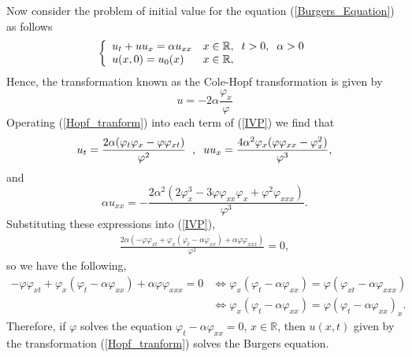    	\noindent Now consider the problem of initial value for the equation (\ref{Burgers_Equation}) as follows
    \begin{equation}
        \left \lbrace \begin{array}{ll}
    	u_t + u u_x = \alpha u_{xx} & x \in \mathbb{R}, \hspace{2mm} t > 0, \hspace{2mm} \alpha > 0 \\
    	u (x, 0) = u_0 (x)  & x \in \mathbb{R},
    	\end{array}  \right .
    	\label{IVP}
    \end{equation}
	Hence, the transformation known as the Cole-Hopf transformation is given by
    \begin{equation}
        u = -2 \alpha \frac{\varphi_x}{\varphi}
        \label{Hopf_tranform}
    \end{equation}
    Operating (\ref{Hopf_tranform}) into each term of (\ref{IVP}) we find that
    \begin{equation*}
        u_t = \frac{2 \alpha (\varphi_t \varphi_x - \varphi \varphi_{x t})}{\varphi^2} \hspace{2mm} , \hspace{2mm} u u_x = \frac{4 \alpha^2 \varphi_x (\varphi \varphi_{xx} - \varphi^2_x)}{\varphi^3},
    \end{equation*}
    and 
    \begin{equation*}
        \alpha u_{xx} = - \frac{2 \alpha^2 (2 \varphi_x^3 - 3 \varphi \varphi_{xx} \varphi_x + \varphi^2 \varphi_{xxx})}{\varphi^3}.
    \end{equation*}
    Substituting these expressions into (\ref{IVP}),
    \begin{align*}
        \frac{2 \alpha (-\varphi \varphi_{x t} +  \varphi_x ( \varphi_t - \alpha \varphi_{xx}) + \alpha \varphi \varphi_{xxx})}{\varphi^2} = 0, 
    \end{align*}
	so we have the following,
	\begin{align*}    
        - \varphi \varphi_{x t} + \varphi_x (\varphi_t - \alpha \varphi_{xx}) + \alpha \varphi \varphi_{xxx} = 0 &\Longleftrightarrow \varphi_x (\varphi_t - \alpha \varphi_{xx}) = \varphi (\varphi_{x t} - \alpha \varphi_{xxx}) \\
        &\Longleftrightarrow \varphi_x (\varphi_t - \alpha \varphi_{xx}) =  \varphi (\varphi_t - \alpha \varphi_{xx})_x.
    \end{align*}
    Therefore, if $\varphi$ solves the equation $\varphi_t - \alpha \varphi_{xx} = 0$, $x \in \mathbb{R}$, then $u(x, t)$ given by the transformation (\ref{Hopf_tranform}) solves the Burgers equation.\\
    
